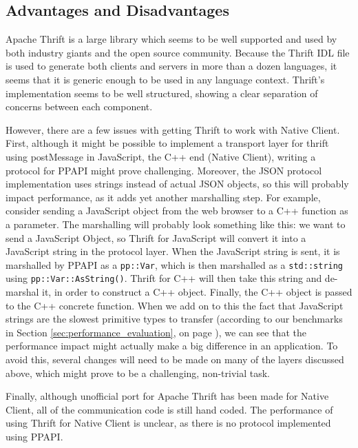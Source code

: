 \subsection{Advantages and Disadvantages} %
\label{sub:thrift_advantages_and_disadvantages}
Apache Thrift is a large library which seems to be well supported and used by both industry giants and the open source community. Because the Thrift IDL file is used to generate both clients and servers in more than a dozen languages, it seems that it is generic enough to be used in any language context. Thrift's implementation seems to be well structured, showing a clear separation of concerns between each component. 

However, there are a few issues with getting Thrift to work with Native Client. First, although it might be possible to implement a transport layer for thrift using postMessage in JavaScript, the C++ end (Native Client), writing a protocol for PPAPI might prove challenging. Moreover, the JSON protocol implementation uses strings instead of actual JSON objects, so this will probably impact performance, as it adds yet another marshalling step. For example, consider sending a JavaScript object from the web browser to a C++ function as a parameter. The marshalling will probably look something like this: we want to send a JavaScript Object, so Thrift for JavaScript will convert it into a JavaScript string in the protocol layer. When the JavaScript string is sent, it is marshalled by PPAPI as a \lstinline{pp::Var}, which is then marshalled as a \lstinline{std::string} using \lstinline{pp::Var::AsString()}. Thrift for C++ will then take this string and de-marshal it, in order to construct a C++ object. Finally, the C++ object is passed to the C++ concrete function. When we add on to this the fact that JavaScript strings are the slowest primitive types to transfer (according to our benchmarks in Section \ref{sec:performance_evaluation}, on page \pageref{sec:performance_evaluation}), we can see that the performance impact might actually make a big difference in an application. To avoid this, several changes will need to be made on many of the layers discussed above, which might prove to be a challenging, non-trivial task.

Finally, although unofficial port for Apache Thrift has been made for Native Client\cite{thriftnacl}, all of the communication code is still hand coded. The performance of using Thrift for Native Client is unclear, as there is no protocol implemented using PPAPI.



